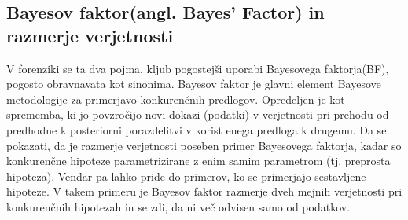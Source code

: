 \documentclass[12pt,a4paper]{amsart}
\theoremstyle{definition} %
\theoremstyle{plain} %
\begin{document}
\subsection{Bayesov faktor(angl. Bayes' Factor) in razmerje verjetnosti}
V forenziki se ta dva pojma, kljub pogostejši uporabi Bayesovega faktorja(BF), pogosto obravnavata kot sinonima. Bayesov faktor je glavni 
element Bayesove metodologije za primerjavo konkurenčnih predlogov. Opredeljen je kot sprememba, ki jo povzročijo novi dokazi (podatki) v 
verjetnosti pri prehodu od predhodne k posteriorni porazdelitvi v korist enega predloga k drugemu. Da se pokazati, da je razmerje verjetnosti 
poseben primer Bayesovega faktorja, kadar so konkurenčne hipoteze parametrizirane z enim samim parametrom (tj. preprosta hipoteza). Vendar pa 
lahko pride do primerov, ko se primerjajo sestavljene hipoteze. V takem primeru je Bayesov faktor razmerje dveh mejnih verjetnosti pri konkurenčnih 
hipotezah in se zdi, da ni več odvisen samo od podatkov. 
\end{document}
